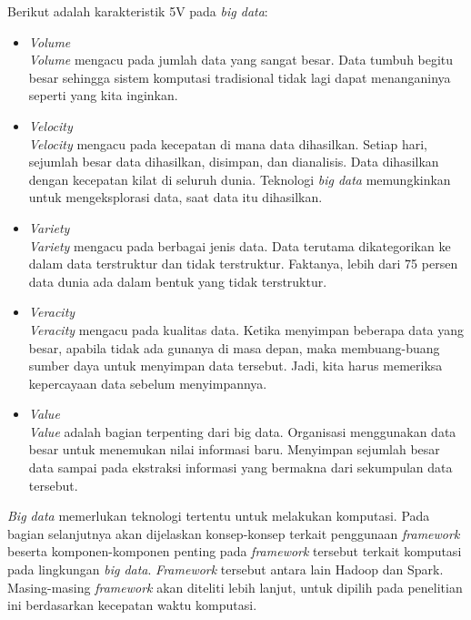 \noindent Berikut adalah karakteristik 5V pada \textit{big data}:

\begin{itemize}
\item \textit{Volume}\\
\textit{Volume} mengacu pada jumlah data yang sangat besar. Data tumbuh begitu besar sehingga sistem komputasi tradisional tidak lagi dapat menanganinya seperti yang kita inginkan.

\item \textit{Velocity}\\
\textit{Velocity} mengacu pada kecepatan di mana data dihasilkan. Setiap hari, sejumlah besar data dihasilkan, disimpan, dan dianalisis. Data dihasilkan dengan kecepatan kilat di seluruh dunia. Teknologi \textit{big data} memungkinkan untuk mengeksplorasi data, saat data itu dihasilkan.

\item \textit{Variety}\\
\textit{Variety} mengacu pada berbagai jenis data. Data terutama dikategorikan ke dalam data terstruktur dan tidak terstruktur. Faktanya, lebih dari 75 persen data dunia ada dalam bentuk yang tidak terstruktur. 

\item \textit{Veracity}\\
\textit{Veracity} mengacu pada kualitas data. Ketika menyimpan beberapa data yang besar, apabila tidak ada gunanya di masa depan, maka membuang-buang sumber daya untuk menyimpan data tersebut. Jadi, kita harus memeriksa kepercayaan data sebelum menyimpannya. 

\item \textit{Value}\\
\textit{Value} adalah bagian terpenting dari big data. Organisasi menggunakan data besar untuk menemukan nilai informasi baru. Menyimpan sejumlah besar data sampai pada ekstraksi informasi yang bermakna dari sekumpulan data tersebut.
\end{itemize}

\noindent \textit{Big data} memerlukan teknologi tertentu untuk melakukan komputasi. Pada bagian selanjutnya akan dijelaskan konsep-konsep terkait penggunaan \textit{framework} beserta komponen-komponen penting pada \textit{framework} tersebut terkait komputasi pada lingkungan \textit{big data}. \textit{Framework} tersebut antara lain Hadoop dan Spark. Masing-masing \textit{framework} akan diteliti lebih lanjut, untuk dipilih pada penelitian ini berdasarkan kecepatan waktu komputasi.

